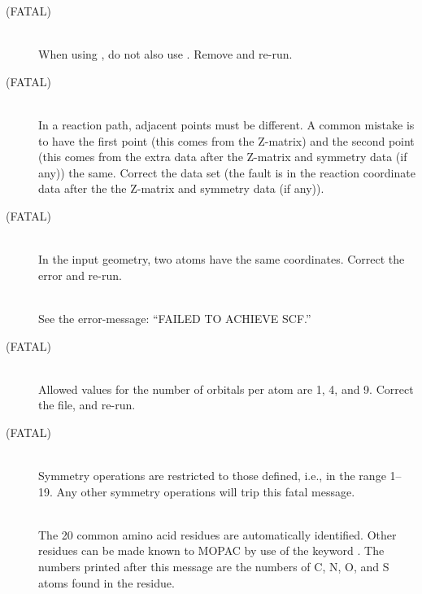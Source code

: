 \begin{description}
\item[ (FATAL)]~\\
When using , do not also use .  Remove 
and re-run.
 
\item[ (FATAL)]~\\
In a reaction path, adjacent points must be different.  A common mistake
is to have the first point (this comes from the Z-matrix) and the second point
(this comes from the extra data after the Z-matrix and symmetry data (if any))
the same.  Correct the data set (the fault is in the reaction coordinate data
after the the Z-matrix and symmetry data (if any)).

\item[ (FATAL)]~\\
In the input geometry, two atoms have the same coordinates.  Correct the
error and re-run.

\item[]~\\
See the error-message: ``FAILED TO ACHIEVE SCF.''

\item[ (FATAL)]~\\
Allowed values for the number of orbitals per atom are 1, 4, and 9.
Correct the  file, and re-run.

\item[ (FATAL)]~\\
Symmetry operations are restricted to those defined, i.e.,  in  the
range 1--19.  Any other symmetry operations will trip this fatal message.

\item[]~\\
The 20 common amino acid residues are automatically identified. Other residues 
can be made known to MOPAC by use of the keyword . The numbers
printed after this message are the numbers of C, N, O, and S atoms found in the
residue.


\end{description}

